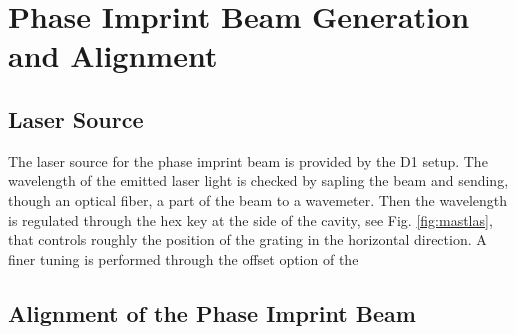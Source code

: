\documentclass[../thesis.tex]{subfiles}
\begin{document}
\chapter{Phase Imprint Beam Generation and Alignment}

\section{Laser Source}

The laser source for the phase imprint beam is provided by the D1 setup. The wavelength of the emitted laser light is checked by sapling the beam and sending, though an optical fiber, a part of the beam to a wavemeter. Then the wavelength is regulated through the hex key at the side of the cavity, see Fig. \ref{fig:mastlas}, that controls roughly the position of the grating in the horizontal direction. A finer tuning is performed through the offset option of the 

\section{Alignment of the Phase Imprint Beam}
\end{document}
